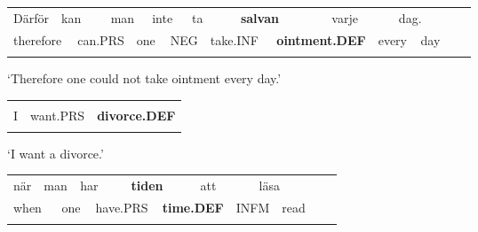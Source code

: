 \begin{tabular}{llllllllllllllllll}
\lsptoprule
Därför & \multicolumn{2}{l}{kan

} & \multicolumn{2}{l}{man

} & \multicolumn{2}{l}{inte

} & \multicolumn{2}{l}{ta

} & \multicolumn{2}{l}{{\bfseries salvan}

} & \multicolumn{2}{l}{varje

} & \multicolumn{2}{l}{dag.

} & \multicolumn{2}{l}{} & \\
\multicolumn{2}{l}{therefore

} & \multicolumn{2}{l}{can.PRS

} & \multicolumn{2}{l}{one

} & \multicolumn{2}{l}{NEG

} & \multicolumn{2}{l}{take.INF

} & \multicolumn{2}{l}{{\bfseries ointment.DEF}

} & \multicolumn{2}{l}{every

} & \multicolumn{2}{l}{day

} & \multicolumn{2}{l}{}\\
\lspbottomrule
\end{tabular}

\begin{styleTranslation}
‘Therefore one could not take ointment every day.’

\end{styleTranslation}

\begin{tabular}{lll}
\lsptoprule
\multicolumn{3}{l}{Ja

}\\
I & want.PRS & {\bfseries divorce.DEF}\\
\lspbottomrule
\end{tabular}

\begin{styleTranslation}
 ‘I want a divorce.’

\end{styleTranslation}

\begin{tabular}{llllllllllllll}
\lsptoprule
när & \multicolumn{2}{l}{man

} & \multicolumn{2}{l}{har

} & \multicolumn{2}{l}{{\bfseries tiden}

} & \multicolumn{2}{l}{att

} & \multicolumn{2}{l}{läsa

} & \multicolumn{2}{l}{} & \\
\multicolumn{2}{l}{when

} & \multicolumn{2}{l}{one

} & \multicolumn{2}{l}{have.PRS

} & \multicolumn{2}{l}{{\bfseries time.DEF}

} & \multicolumn{2}{l}{INFM

} & \multicolumn{2}{l}{read

} & \multicolumn{2}{l}{}\\
\lspbottomrule
\end{tabular}

